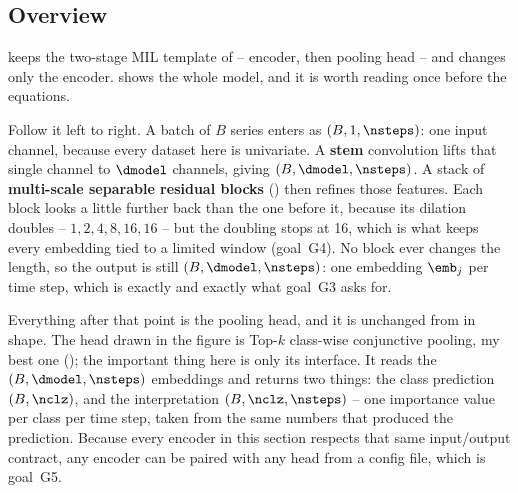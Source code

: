 \subsection{Overview}
\label{sec:arch:overview}

\seanet{} keeps the two-stage MIL template of  -- encoder, then pooling head --
and changes only the encoder.  shows the whole model, and it is worth reading
once before the equations.

Follow it left to right. A batch of $B$ series enters as $(B, 1, \nsteps)$: one input channel,
because every dataset here is univariate. A \textbf{stem} convolution lifts that single channel to
$\dmodel$ channels, giving $(B, \dmodel, \nsteps)$. A stack of \textbf{multi-scale separable
residual blocks} () then refines those features. Each block looks a little
further back than the one before it, because its dilation doubles -- $1, 2, 4, 8, 16, 16$ -- but the
doubling stops at 16, which is what keeps every embedding tied to a limited window (goal~G4). No
block ever changes the length, so the output is still $(B, \dmodel, \nsteps)$: one embedding
$\emb_j$ per time step, which is exactly  and exactly what goal~G3 asks
for.

Everything after that point is the pooling head, and it is unchanged from \millet{} in shape. The
head drawn in the figure is Top-$k$ class-wise conjunctive pooling, my best one
(); the important thing here is only its interface. It reads the
$(B, \dmodel, \nsteps)$ embeddings and returns two things: the class prediction $(B, \nclz)$, and
the interpretation $(B, \nclz, \nsteps)$ -- one importance value per class per time step, taken from
the same numbers that produced the prediction. Because every encoder in this section respects that
same input/output contract, any encoder can be paired with any head from a config file, which is
goal~G5.

